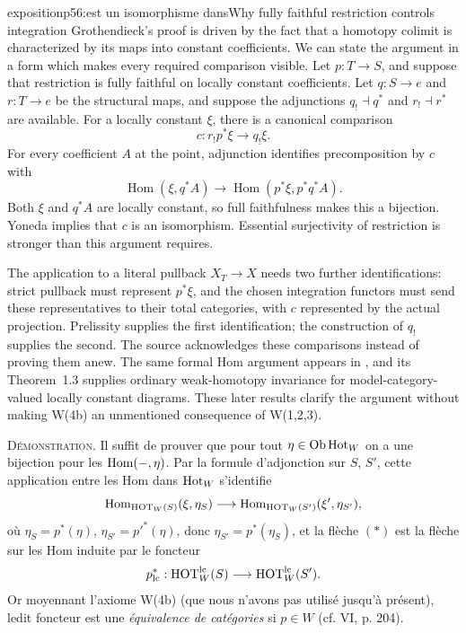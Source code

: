 \begin{dcomment}{exposition}{p56:est un isomorphisme dans}{Why fully faithful restriction controls integration}
Grothendieck's proof is driven by the fact that a homotopy colimit is characterized by its maps into constant coefficients. We can state the argument in a form which makes every required comparison visible. Let $p:T\to S$, and suppose that restriction is fully faithful on locally constant coefficients. Let $q:S\to e$ and $r:T\to e$ be the structural maps, and suppose the adjunctions $q_!\dashv q^*$ and $r_!\dashv r^*$ are available. For a locally constant $\xi$, there is a canonical comparison
\[
 c:r_!p^*\xi\longrightarrow q_!\xi.
\]
For every coefficient $A$ at the point, adjunction identifies precomposition by $c$ with
\[
 \operatorname{Hom}(\xi,q^*A)
 \longrightarrow
 \operatorname{Hom}(p^*\xi,p^*q^*A).
\]
Both $\xi$ and $q^*A$ are locally constant, so full faithfulness makes this a bijection. Yoneda implies that $c$ is an isomorphism. Essential surjectivity of restriction is stronger than this argument requires.

The application to a literal pullback $X_T\to X$ needs two further identifications: strict pullback must represent $p^*\xi$, and the chosen integration functors must send these representatives to their total categories, with $c$ represented by the actual projection. Prelissity supplies the first identification; the construction of $q_!$ supplies the second. The source acknowledges these comparisons instead of proving them anew. The same formal Hom argument appears in \citet[Proposition~1.10]{Cisinski2009LocallyConstant}, and its Theorem~1.3 supplies ordinary weak-homotopy invariance for model-category-valued locally constant diagrams. These later results clarify the argument without making W(4b) an unmentioned consequence of W(1,2,3).
\end{dcomment}


\textsc{Démonstration}. Il suffit de prouver que pour tout $\eta \in \mathrm{Ob}\,\mathrm{Hot}_W$ on a une bijection pour les $\mathrm{Hom}(-,\eta)$. Par la formule d'adjonction sur $S$, $S'$, cette application entre les Hom dans $\mathrm{Hot}_W$ s'identifie
\[
\mathrm{Hom}_{\mathrm{HOT}_W(S)}(\xi,\eta_S) \longrightarrow \mathrm{Hom}_{\mathrm{HOT}_W(S')}(\xi',\eta_{S'}),
\]
où $\eta_S = p^*(\eta)$, $\eta_{S'} = p'^*(\eta)$, donc $\eta_{S'} = p^*(\eta_S)$, et la flèche $(*)$ est la flèche sur les Hom induite par le foncteur
\[
p^*_{\mathrm{lc}} : \mathrm{HOT}^{\mathrm{lc}}_W(S) \longrightarrow \mathrm{HOT}^{\mathrm{lc}}_W(S').
\]
Or moyennant l'axiome W(4b) (que nous n'avons pas utilisé jusqu'à présent), ledit foncteur est une \textit{équivalence de catégories} si $p \in W$ (cf. VI, p. 204).


